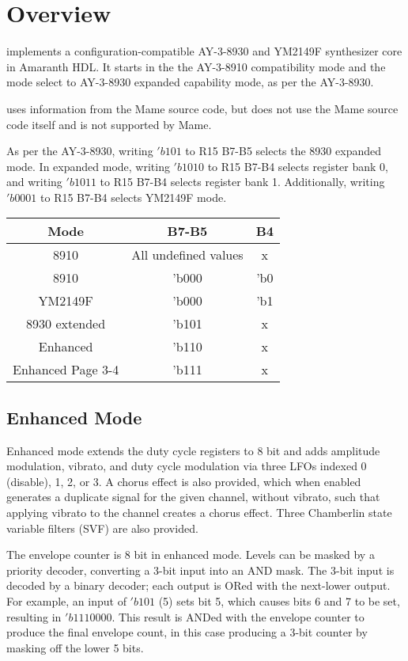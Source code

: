 
\chapter{Overview}

\projectname{ }implements a configuration-compatible AY-3-8930 and YM2149F synthesizer core in Amaranth HDL.  It starts in the the AY-3-8910 compatibility mode and the mode select to AY-3-8930 expanded capability mode, as per the AY-3-8930.

\projectname{ }uses information from the Mame source code, but does not use the Mame source code itself and is not supported by Mame.

As per the AY-3-8930, writing $'b101$ to R15 B7-B5 selects the 8930 expanded mode.  In expanded mode, writing $'b1010$ to R15 B7-B4 selects register bank 0, and writing $'b1011$ to R15 B7-B4 selects register bank 1.  Additionally, writing $'b0001$ to R15 B7-B4 selects YM2149F mode.

\begin{tabular}{|c|c|c|}
	\hline
	Mode & B7-B5 & B4 \\
	\hline
	8910 & All undefined values & x \\
	\hline
	8910 & 'b000 & 'b0 \\
	\hline
	YM2149F & 'b000 & 'b1 \\
	\hline
	8930 extended & 'b101 & x \\
	\hline
	Enhanced & 'b110 & x \\
	\hline
	Enhanced Page 3-4 & 'b111 & x \\
	\hline
\end{tabular}

\section{Enhanced Mode}

Enhanced mode extends the duty cycle registers to 8 bit and adds amplitude modulation, vibrato, and duty cycle modulation via three LFOs indexed 0 (disable), 1, 2, or 3.  A chorus effect is also provided, which when enabled generates a duplicate signal for the given channel, without vibrato, such that applying vibrato to the channel creates a chorus effect.  Three Chamberlin state variable filters (SVF) are also provided.

The envelope counter is 8 bit in enhanced mode.  Levels can be masked by a priority decoder, converting a 3-bit input into an AND mask.  The 3-bit input is decoded by a binary decoder; each output is ORed with the next-lower output.  For example, an input of $'b101$ (5) sets bit 5, which causes bits 6 and 7 to be set, resulting in $'b1110000$.  This result is ANDed with the envelope counter to produce the final envelope count, in this case producing a 3-bit counter by masking off the lower 5 bits.

